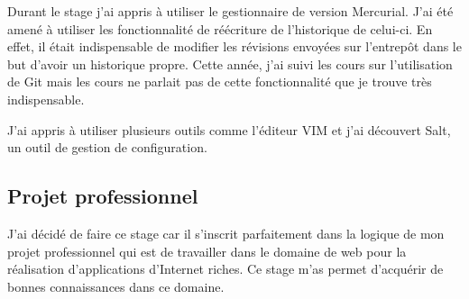 Durant le stage j'ai appris à utiliser le gestionnaire de version Mercurial. J'ai été amené à utiliser les fonctionnalité de réécriture de l'historique de celui-ci. En effet, il était indispensable de modifier les révisions envoyées sur l'entrepôt dans le but d'avoir un historique propre. Cette année, j'ai suivi les cours sur l'utilisation de Git mais les cours ne parlait pas de cette fonctionnalité que je trouve très indispensable. 

J'ai appris à utiliser plusieurs outils comme l'éditeur VIM et j'ai découvert Salt, un outil de gestion de configuration. 
\subsection{Projet professionnel}
J'ai décidé de faire ce stage car il s'inscrit parfaitement dans la logique de mon projet professionnel qui est de travailler dans le domaine de web pour la réalisation d'applications d'Internet riches. Ce stage m'as permet d'acquérir de bonnes connaissances dans ce domaine.  
